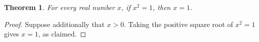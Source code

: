 \documentclass{article}
\newtheorem{theorem}{Theorem}
\begin{document}
\begin{theorem}\label{thm:scope-extra-assumption}
For every real number $x$, if $x^2=1$, then $x=1$.
\end{theorem}
\begin{proof}
Suppose additionally that $x>0$. Taking the positive square root of
$x^2=1$ gives $x=1$, as claimed.
\end{proof}
\end{document}
